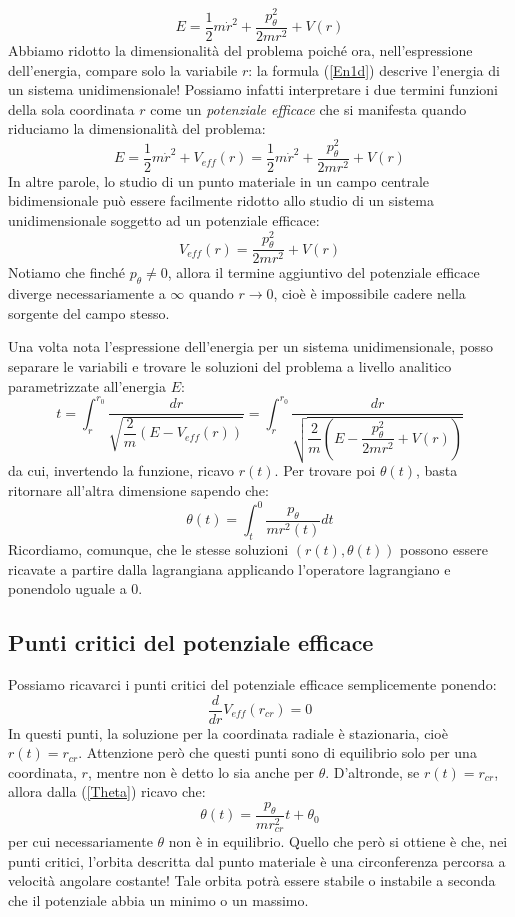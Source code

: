 \documentclass[a4paper,openany]{article}
\begin{document}
	\begin{equation}
		E = \dfrac{1}{2}m\dot{r}^{2} + \dfrac{p_{\theta}^{2}}{2mr^{2}} + V(r)
		\label{En1d}
	\end{equation}
	Abbiamo ridotto la dimensionalità del problema poiché ora, nell'espressione dell'energia, compare solo la variabile $r$: la formula (\ref{En1d}) descrive l'energia di un sistema unidimensionale! Possiamo infatti interpretare i due termini funzioni della sola coordinata $r$ come un \textit{potenziale efficace} che si manifesta quando riduciamo la dimensionalità del problema:
	\begin{equation}
		E = \dfrac{1}{2}m\dot{r}^{2} + V_{eff}(r) = \dfrac{1}{2}m\dot{r}^{2} +  \dfrac{p_{\theta}^{2}}{2mr^{2}} + V(r)
	\end{equation}
	In altre parole, lo studio di un punto materiale in un campo centrale bidimensionale può essere facilmente ridotto allo studio di un sistema unidimensionale soggetto ad un potenziale efficace:
	$$
	V_{eff}(r) = \dfrac{p_{\theta}^{2}}{2mr^{2}} + V(r)
	$$
	Notiamo che finché $p_{\theta} \neq 0$, allora il termine aggiuntivo del potenziale efficace diverge necessariamente a $\infty$ quando $r\to 0$, cioè è impossibile cadere nella sorgente del campo stesso.
	
	Una volta nota l'espressione dell'energia per un sistema unidimensionale, posso separare le variabili e trovare le soluzioni del problema a livello analitico parametrizzate all'energia $E$:
	\begin{equation}
		t = \int_{r}^{r_{0}}\dfrac{dr}{\sqrt{\dfrac{2}{m}(E-V_{eff}(r))}} = \int_{r}^{r_{0}}\dfrac{dr}{\sqrt{\dfrac{2}{m}(E-\dfrac{p_{\theta}^{2}}{2mr^{2}} + V(r))}}
		\label{SoluzKep}
	\end{equation}
	da cui, invertendo la funzione, ricavo $r(t)$. Per trovare poi $\theta(t)$, basta ritornare all'altra dimensione sapendo che:
	\begin{equation}
		\theta(t) = \int_{t}^{0}\dfrac{p_{\theta}}{mr^{2}(t)}dt
		\label{Theta}
	\end{equation}
	Ricordiamo, comunque, che le stesse soluzioni $(r(t),\theta(t))$ possono essere ricavate a partire dalla lagrangiana applicando l'operatore lagrangiano e ponendolo uguale a $0$.
	\subsection{Punti critici del potenziale efficace}
	Possiamo ricavarci i punti critici del potenziale efficace semplicemente ponendo:
	\begin{equation}
		\dfrac{d}{dr}V_{eff}(r_{cr}) = 0
	\end{equation}
	In questi punti, la soluzione per la coordinata radiale è stazionaria, cioè $r(t) = r_{cr}$. Attenzione però che questi punti sono di equilibrio solo per una coordinata, $r$, mentre non è detto lo sia anche per $\theta$. D'altronde, se $r(t)= r_{cr}$, allora dalla (\ref{Theta}) ricavo che:
	$$
	\theta(t) = \dfrac{p_{\theta}}{mr^{2}_{cr}}t + \theta_{0}
	$$
	per cui necessariamente $\theta$ non è in equilibrio. Quello che però si ottiene è che, nei punti critici, l'orbita descritta dal punto materiale è una circonferenza percorsa a velocità angolare costante! Tale orbita potrà essere stabile o instabile a seconda che il potenziale abbia un minimo o un massimo.
\end{document}
